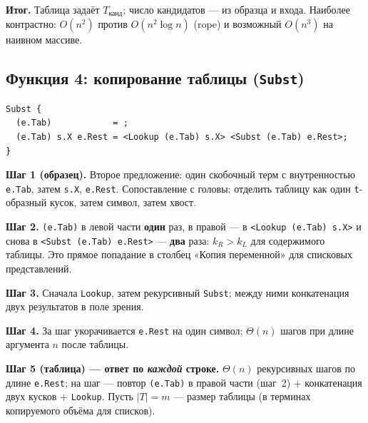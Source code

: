 \documentclass[12pt,a4paper]{article}
\newcommand{\bigO}{\ensuremath{O}}
\begin{document}
\textbf{Итог.} Таблица задаёт \(T_{\text{канд}}\); число кандидатов --- из образца и входа. Наиболее контрастно: \(\bigO(n^2)\) против \(\bigO(n^2\log n)\) (rope) и возможный \(\bigO(n^3)\) на наивном массиве.

\subsection{Функция 4: копирование таблицы (\texttt{Subst})}

\begin{lstlisting}
Subst {
  (e.Tab)            = ;
  (e.Tab) s.X e.Rest = <Lookup (e.Tab) s.X> <Subst (e.Tab) e.Rest>;
}
\end{lstlisting}

\textbf{Шаг 1 (образец).} Второе предложение: один скобочный терм с внутренностью \texttt{e.Tab}, затем \texttt{s.X}, \texttt{e.Rest}. Сопоставление с головы: отделить таблицу как один \texttt{t}-образный кусок, затем символ, затем хвост.

\textbf{Шаг 2.} \texttt{(e.Tab)} в левой части \textbf{один} раз, в правой --- в \texttt{<Lookup (e.Tab) s.X>} и снова в \texttt{<Subst (e.Tab) e.Rest>} --- \textbf{два} раза: \(k_R>k_L\) для содержимого таблицы. Это прямое попадание в столбец «Копия переменной» для списковых представлений.

\textbf{Шаг 3.} Сначала \texttt{Lookup}, затем рекурсивный \texttt{Subst}; между ними конкатенация двух результатов в поле зрения.

\textbf{Шаг 4.} За шаг укорачивается \texttt{e.Rest} на один символ; \(\Theta(n)\) шагов при длине аргумента \(n\) после таблицы.

\textbf{Шаг 5 (таблица) --- ответ по \emph{каждой} строке.} \(\Theta(n)\) рекурсивных шагов по длине \texttt{e.Rest}; на шаг --- повтор \texttt{(e.Tab)} в правой части (шаг~2) + конкатенация двух кусков + \texttt{Lookup}. Пусть \(|T|=m\) --- размер таблицы (в терминах копируемого объёма для списков).
\end{document}
